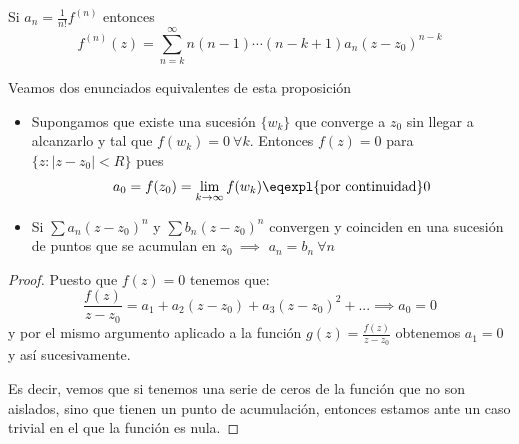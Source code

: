 \documentclass{apuntes}
\begin{document}
\obs Si $a_n = \frac{1}{n!}f^{(n)}$ entonces
\[f^{(n)}(z)=\sum_{n=k}^{\infty}n(n-1)\cdots (n-k+1)a_n(z-z_0)^{n-k}\]

\begin{prop}
Veamos dos enunciados equivalentes de esta proposición
\begin{itemize}
\item Supongamos que existe una sucesión $\{w_k\}$ que converge a $z_0$ sin llegar a alcanzarlo y tal que $f(w_k)=0 \ \forall k$. Entonces $f(z)=0$ para $\{z: |z-z_0|<R\}$ pues
\[a_0=f(z_0)=\lim_{k \to \infty} f(w_k) \eqexpl{\text{por continuidad}} 0 \]
\item Si $\sum a_n(z-z_0)^n$ y $\sum b_n(z-z_0)^n$ convergen y coinciden en una sucesión de puntos que se acumulan en $z_0 \ \implies$ $a_n=b_n \ \forall n$
\end{itemize}
\end{prop}
\begin{proof}
Puesto que $f(z)=0$ tenemos que:
\[\frac{f(z)}{z-z_0}=a_1+a_2(z-z_0)+a_3(z-z_0)^2+... \implies a_0=0\]
y por el mismo argumento aplicado a la función $g(z)=\frac{f(z)}{z-z_0}$ obtenemos $a_1=0$ y así sucesivamente.

Es decir, vemos que si tenemos una serie de ceros de la función que no son aislados, sino que tienen un punto de acumulación, entonces estamos ante un caso trivial en el que la función es nula.
\end{proof}
\end{document}
